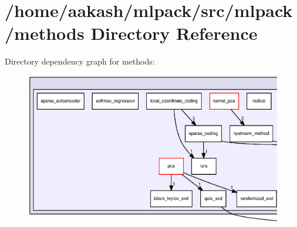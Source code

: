 \section{/home/aakash/mlpack/src/mlpack/methods Directory Reference}
\label{dir_3cfbf900288ec2fe8dd2c2c8482f216e}
Directory dependency graph for methods\+:
\nopagebreak
\begin{figure}[H]
\begin{center}
\leavevmode
\includegraphics[width=350pt]{dir_3cfbf900288ec2fe8dd2c2c8482f216e_dep}
\end{center}
\end{figure}
